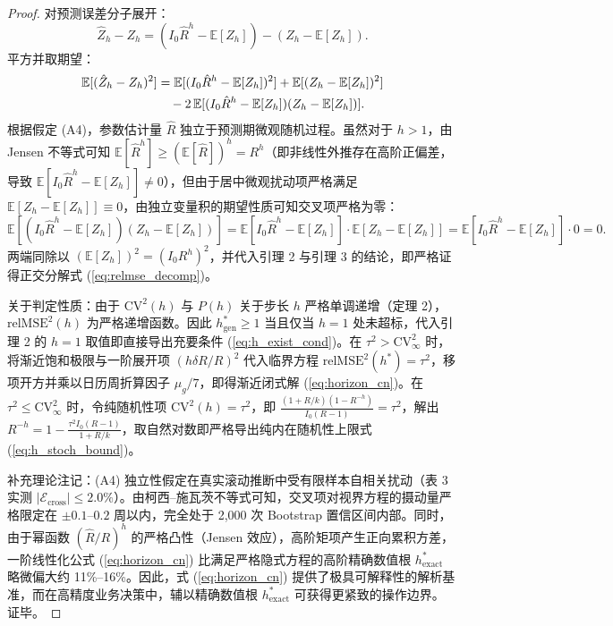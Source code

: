 \documentclass[11pt,a4paper]{article}
\theoremstyle{plain}
\theoremstyle{definition}
\begin{document}
\begin{proof}
对预测误差分子展开：
\begin{equation}
\hat{Z}_h - Z_h = (I_0 \hat{R}^h - \mathbb{E}[Z_h]) - (Z_h - \mathbb{E}[Z_h]).
\end{equation}
平方并取期望：
\begin{align}
\mathbb{E}[(\hat{Z}_h - Z_h)^2] &= \mathbb{E}[(I_0 \hat{R}^h - \mathbb{E}[Z_h])^2] + \mathbb{E}[(Z_h - \mathbb{E}[Z_h])^2] \notag \\
&\quad - 2\,\mathbb{E}[(I_0 \hat{R}^h - \mathbb{E}[Z_h])(Z_h - \mathbb{E}[Z_h])].
\end{align}
根据假定 (A4)，参数估计量 $\hat{R}$ 独立于预测期微观随机过程。虽然对于 $h > 1$，由 Jensen 不等式可知 $\mathbb{E}[\hat{R}^h] \ge (\mathbb{E}[\hat{R}])^h = R^h$（即非线性外推存在高阶正偏差，导致 $\mathbb{E}[I_0 \hat{R}^h - \mathbb{E}[Z_h]] \ne 0$），但由于居中微观扰动项严格满足 $\mathbb{E}[Z_h - \mathbb{E}[Z_h]] \equiv 0$，由独立变量积的期望性质可知交叉项严格为零：
\begin{equation}
\mathbb{E}[(I_0 \hat{R}^h - \mathbb{E}[Z_h])(Z_h - \mathbb{E}[Z_h])] = \mathbb{E}[I_0 \hat{R}^h - \mathbb{E}[Z_h]] \cdot \mathbb{E}[Z_h - \mathbb{E}[Z_h]] = \mathbb{E}[I_0 \hat{R}^h - \mathbb{E}[Z_h]] \cdot 0 = 0.
\end{equation}
两端同除以 $(\mathbb{E}[Z_h])^2 = (I_0 R^h)^2$，并代入引理 2 与引理 3 的结论，即严格证得正交分解式 (\ref{eq:relmse_decomp})。

关于判定性质：由于 $\text{CV}^2(h)$ 与 $P(h)$ 关于步长 $h$ 严格单调递增（定理 2），$\text{relMSE}^2(h)$ 为严格递增函数。因此 $h^*_{\text{gen}} \ge 1$ 当且仅当 $h=1$ 处未超标，代入引理 2 的 $h=1$ 取值即直接导出充要条件 (\ref{eq:h_exist_cond})。在 $\tau^2 > \text{CV}^2_\infty$ 时，将渐近饱和极限与一阶展开项 $(h\delta R/R)^2$ 代入临界方程 $\text{relMSE}^2(h^*) = \tau^2$，移项开方并乘以日历周折算因子 $\mu_g/7$，即得渐近闭式解 (\ref{eq:horizon_cn})。在 $\tau^2 \le \text{CV}^2_\infty$ 时，令纯随机性项 $\text{CV}^2(h) = \tau^2$，即 $\frac{(1+R/k)(1-R^{-h})}{I_0(R-1)} = \tau^2$，解出 $R^{-h} = 1 - \frac{\tau^2 I_0(R-1)}{1+R/k}$，取自然对数即严格导出纯内在随机性上限式 (\ref{eq:h_stoch_bound})。

补充理论注记：(A4) 独立性假定在真实滚动推断中受有限样本自相关扰动（表 3 实测 $|\mathcal{E}_{\text{cross}}| \le 2.0\%$）。由柯西--施瓦茨不等式可知，交叉项对视界方程的摄动量严格限定在 $\pm 0.1\text{--}0.2$ 周以内，完全处于 2,000 次 Bootstrap 置信区间内部。同时，由于幂函数 $(\hat{R}/R)^h$ 的严格凸性（Jensen 效应），高阶矩项产生正向累积方差，一阶线性化公式 (\ref{eq:horizon_cn}) 比满足严格隐式方程的高阶精确数值根 $h^*_{\text{exact}}$ 略微偏大约 11\%--16\%。因此，式 (\ref{eq:horizon_cn}) 提供了极具可解释性的解析基准，而在高精度业务决策中，辅以精确数值根 $h^*_{\text{exact}}$ 可获得更紧致的操作边界。
证毕。
\end{proof}
\end{document}
